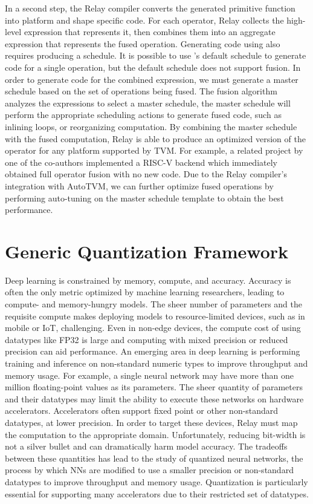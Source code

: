In a second step, the Relay compiler converts the generated primitive
  function into platform and shape specific code.
For each operator, Relay collects the high-level \tvm expression that represents it,
  then combines them into an aggregate expression that represents the fused operation.
Generating code using \tvm also requires producing a schedule.
It is possible to use \tvm's default schedule to generate code for a single operation,
  but the default schedule does not support fusion.
In order to generate code for the combined expression, we must generate a
  master schedule based on the set of operations being fused.
The fusion algorithm analyzes the expressions to select a master
  schedule, the master schedule will perform the appropriate scheduling
  actions to generate fused code, such as inlining loops, or reorganizing
  computation.
By combining the master schedule with the fused computation,
  Relay is able to produce an optimized version of the operator
  for any platform supported by TVM.
For example, a related project by one of the co-authors implemented
  a RISC-V backend which immediately obtained full operator fusion
  with no new code.
Due to the Relay compiler's integration with AutoTVM, we can further
  optimize fused operations by performing auto-tuning on the master
  schedule template to obtain the best performance.

\section{Generic Quantization Framework}
\label{sec:quant}

Deep learning is constrained by memory, compute, and accuracy.
Accuracy is often the only metric optimized by machine learning
  researchers, leading to compute- and memory-hungry models.
The sheer number of parameters and the requisite compute
  makes deploying models to resource-limited devices,
  such as in mobile or IoT, challenging.
Even in non-edge devices, the compute cost of using
  datatypes like FP32 is large and computing with mixed precision
  or reduced precision can aid performance.
 An emerging area in deep learning is performing training and inference on
  non-standard numeric types to improve throughput and memory usage.
For example, a single neural network may have more than one million floating-point values
  as its parameters.
The sheer quantity of parameters and their datatypes may limit the ability
  to execute these networks on hardware accelerators.
Accelerators often support fixed point or other non-standard datatypes, at lower precision.
In order to target these devices, Relay must map the computation
  to the appropriate domain.
Unfortunately, reducing bit-width is not a silver bullet and
  can dramatically harm model accuracy.
The tradeoffs between these quantities has lead to the study of quantized neural networks,
  the process by which NNs are modified to use a smaller precision
  or non-standard datatypes to improve throughput and memory usage.
Quantization is particularly essential for supporting many accelerators due to
  their restricted set of datatypes.

